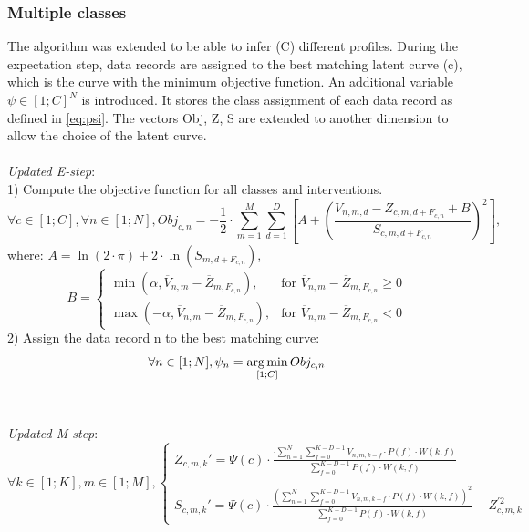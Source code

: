 \subsubsection{Multiple classes} \label{sec:multiclass}
The algorithm was extended to be able to infer (C) different profiles. During the expectation step, data records are assigned to the best matching latent curve (c), which is the curve with the minimum objective function. An additional variable $\psi \in [1; C]^N$ is introduced. It stores the class assignment of each data record as defined in \ref{eq:psi}. The vectors Obj, Z, S are extended to another dimension to allow the choice of the latent curve.\\\\
\textit{Updated E-step}: \\
1) Compute the objective function for all classes and interventions.
\begin{equation}\label{eq:multiobj}
    \forall c \in [1;C], \forall n \in [1;N], Obj_{c,n} = -\frac{1}{2} \cdot \sum_{m=1}^M \sum_{d=1}^D \left[ A + \left( \frac{V_{n,m,d} - Z_{c,m,d+F_{c,n}} + B }{ S_{c,m,d+F_{c,n}} } \right)^2 \right],
\end{equation} 
where: $ A = \ln(2\cdot \pi) + 2\cdot \ln( S_{m,d+F_{c,n}} )$,
\begin{equation}
    B = 
    \begin{cases}
        \min (\alpha, \overline{V}_{n,m} - \overline{Z}_{m,F_{c,n}} ), & \text{for } \overline{V}_{n,m} - \overline{Z}_{m,F_{c,n}} \geq 0\\
        \max (-\alpha, \overline{V}_{n,m} - \overline{Z}_{m,F_{c,n}} ), & \text{for } \overline{V}_{n,m} - \overline{Z}_{m,F_{c,n}} < 0
    \end{cases}
\end{equation}
2) Assign the data record n to the best matching curve:
\begin{equation} \label{eq:psi}
    \forall n \in [1;N], \psi_n = \operatorname*{arg\,min}_{[1;C]}Obj_{c,n}
\end{equation} \\\\
\textit{Updated M-step}:
\begin{equation}
    \forall k \in [1;K], m \in [1;M],
    \begin{cases}
        Z_{c,m,k}' = \Psi(c)\cdot \frac{ \cdot \sum_{n=1}^N \sum_{f=0}^{K-D-1} V_{n,m,k-f} \cdot P(f) \cdot W(k,f) }{ \sum_{f=0}^{K-D-1} P(f)\cdot W(k,f) }\\\\
        S_{c,m,k}' = \Psi(c)\cdot \frac{\left( \sum_{n=1}^N \sum_{f=0}^{K-D-1} V_{n,m,k-f} \cdot P(f) \cdot W(k,f) \right)^2}{ \sum_{f=0}^{K-D-1} P(f)\cdot W(k,f) } - Z_{c,m,k}^{'2}
    \end{cases}
\end{equation}
